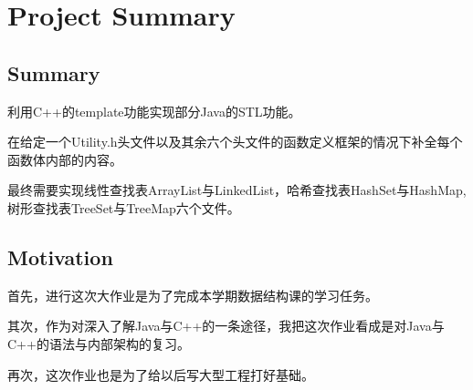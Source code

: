 \chapter{Project Summary}
\section{Summary}
利用C++的template功能实现部分Java的STL功能。
\par
在给定一个Utility.h头文件以及其余六个头文件的函数定义框架的情况下补全每个函数体内部的内容。
\par
最终需要实现线性查找表ArrayList与LinkedList，哈希查找表HashSet与HashMap,树形查找表TreeSet与TreeMap六个文件。
\section{Motivation}
首先，进行这次大作业是为了完成本学期数据结构课的学习任务。
\par
其次，作为对深入了解Java与C++的一条途径，我把这次作业看成是对Java与C++的语法与内部架构的复习。
\par
再次，这次作业也是为了给以后写大型工程打好基础。
